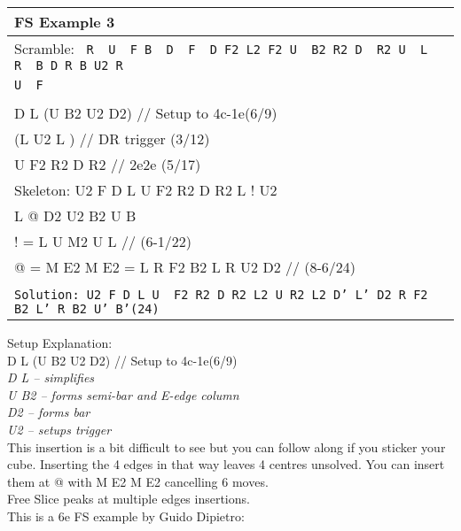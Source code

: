 \documentclass[11pt,a4paper]{book}
\newcommand{\p}{\textquotesingle}
\newcommand{\m}{\texttt}
\newcommand{\ps}{\p\,\,}
\newcommand{\comment}[1]{{\color{gray}\quad//#1}}
\begin{document}
\bigskip
\begin{tabular}{|l|}
\hline
\textbf{FS Example 3 }\\
\hline
Scramble: \m{ R\ps U\ps F B\ps D\ps F\ps D F2 L2 F2 U\ps B2 R2 D\ps R2 U\ps L R\ps B D R B U2 R\ps}\\ \m{U\ps F}\\
\hline
\begin{minipage}[l]{0.650\textwidth}
\bigskip
\m{
(B) U2 F \comment{ EO (3/3)}\\
D L (U B2 U2 D2) \comment{ Setup to 4c-1e(6/9)}\\
(L\ps U2 L\ps) \comment{ DR trigger (3/12)}\\
U\ps F2 R2 D R2 \comment{ 2e2e (5/17)}\\
\newline
Skeleton: U2 F D L U\ps F2 R2 D R2 L !  U2\\ L @ D2 U2 B2 U\ps B\ps \\
! = L U M2 U\ps L\ps \comment{ (6-1/22) }\\
@ = M\ps E2 M E2 = L\ps R F2 B2 L\ps R U2 D2  \comment{ (8-6/24)}\\
}
\bigskip
\end{minipage}
\begin{minipage}[c]{0.25\textwidth}
\centering
\def\svgwidth{\columnwidth}

\end{minipage}\\
\hline
\m{Solution: U2 F D L  U\ps F2 R2 D R2 L2 U R2 L2  D' L' D2 R F2 B2 L' R B2 U' B'(24)}\\
\hline
\end{tabular}
\bigskip
\newpage
\hfill \break
Setup Explanation:\\
D L (U B2 U2 D2) \comment{ Setup to 4c-1e(6/9)}\\
\textit{ D L – simplifies\\
U B2 – forms semi-bar and E-edge column\\
D2 – forms bar\\
U2 – setups trigger}\\
\newline
This insertion is a bit difficult to see but you can follow along if you sticker your cube. Inserting the 4 edges in that way leaves 4 centres unsolved. You can insert them at @ with M\ps E2 M E2 cancelling 6 moves.\\
Free Slice peaks at multiple edges insertions.\\
\newline
This is a 6e FS example by Guido Dipietro:
\end{document}
